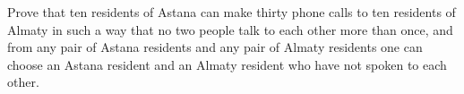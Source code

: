 Prove that ten residents of Astana can make thirty phone calls to ten residents of Almaty in such a way that no two people talk to each other more than once, and from any pair of Astana residents and any pair of Almaty residents one can choose an Astana resident and an Almaty resident who have not spoken to each other.
